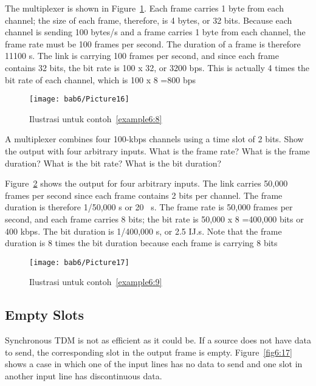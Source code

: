 \begin{solution}
  The multiplexer is shown in Figure~\ref{fig6:15}. Each frame carries 1 byte from each channel; the size of each frame, therefore, is 4 bytes, or 32 bits. Because each channel is sending 100 bytes/s and a frame carries 1 byte from each channel, the frame rate must be 100 frames per second. The duration of a frame is therefore 11100 s. The link is carrying 100 frames per second, and since each frame contains 32 bits, the bit rate is 100 x 32, or 3200 bps. This is actually 4 times the bit rate of each channel, which is 100 x 8 =800 bps
\end{solution}

\begin{figure}[htbp]
  \centering
  \texttt{[image: bab6/Picture16]}
  \caption{Ilustrasi untuk contoh~\ref{example6:8}}
  \label{fig6:15}
\end{figure}

\begin{example}
  A multiplexer combines four 100-kbps channels using a time slot of 2 bits. Show the output with four arbitrary inputs. What is the frame rate? What is the frame duration? What is the bit rate? What is the bit duration?
  \label{example6:9}
\end{example}

\begin{solution}
  Figure~\ref{fig6:16} shows the output for four arbitrary inputs. The link carries 50,000 frames per second since each frame contains 2 bits per channel. The frame duration is therefore 1/50,000 s or 20 ~s. The frame rate is 50,000 frames per second, and each frame carries 8 bits; the bit rate is 50,000 x 8 =400,000 bits or 400 kbps. The bit duration is 1/400,000 s, or 2.5 IJ.s. Note that the frame duration is 8 times the bit duration because each frame is carrying 8 bits
\end{solution}

\begin{figure}[htbp]
  \centering
  \texttt{[image: bab6/Picture17]}
  \caption{Ilustrasi untuk contoh~\ref{example6:9}}
  \label{fig6:16}
\end{figure}

\subsection*{Empty Slots}
Synchronous TDM is not as efficient as it could be. If a source does not have data to send, the corresponding slot in the output frame is empty. Figure~\ref{fig6:17} shows a case in which one of the input lines has no data to send and one slot in another input line has discontinuous data.

